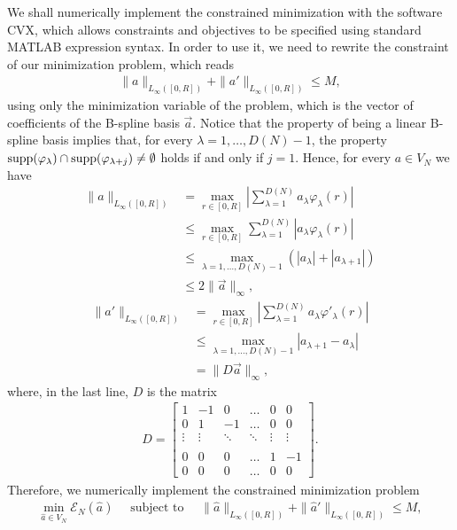We shall numerically implement the constrained minimization with the software CVX, which allows constraints and objectives to be specified using standard MATLAB expression syntax. In order to use it, we need to rewrite the constraint of our minimization problem, which reads
\begin{align*}
	\|a\|_{L_{\infty}([0,R])} + \|a'\|_{L_{\infty}([0,R])} \leq M,
\end{align*}
using only the minimization variable of the problem, which is the vector of coefficients of the B-spline basis $\vec{a}$. Notice that the property of being a linear B-spline basis implies that, for every $\lambda = 1, \ldots, D(N)-1$, the property $\operatorname{supp}(\varphi_{\lambda}) \cap \operatorname{supp}(\varphi_{\lambda + j}) \not= \emptyset$ holds if and only if $j = 1$. Hence, for every $a \in V_N$ we have
\begin{align*}
\|a\|_{L_{\infty}([0,R])} &= \max_{r \in [0,R]} \left|\sum^{D(N)}_{\lambda = 1} a_{\lambda} \varphi_{\lambda}(r)\right| \\
& \leq \max_{r \in [0,R]} \sum^{D(N)}_{\lambda = 1} \left|a_{\lambda} \varphi_{\lambda}(r)\right| \\
& \leq \max_{\lambda = 1, \ldots, D(N)-1} \left(|a_{\lambda}| + |a_{\lambda+1}|\right) \\
& \leq 2 \|\vec{a}\|_{\infty},
\end{align*}
\begin{align*}
\|a'\|_{L_{\infty}([0,R])} &= \max_{r \in [0,R]} \left|\sum^{D(N)}_{\lambda = 1} a_{\lambda} \varphi'_{\lambda}(r)\right| \\
& \leq \max_{\lambda = 1, \ldots, D(N)-1} |a_{\lambda+1} - a_{\lambda}| \\
& = \|D\vec{a}\|_{\infty},
\end{align*}
where, in the last line, $D$ is the matrix
\begin{align*}
D = \begin{bmatrix}
    1       & -1 & 0 & \dots & 0 & 0 \\
    0     & 1 & -1 & \dots & 0 & 0 \\
   \vdots & \vdots & \ddots & \ddots & \vdots & \vdots \\ \\
    0       & 0 & 0 & \dots & 1 & -1 \\
    0       & 0 & 0 & \dots & 0 & 0
\end{bmatrix}.
\end{align*}
Therefore, we numerically implement the constrained minimization problem
\begin{align*}
\min_{\widehat{a} \in V_N} \mathcal{E}_N(\widehat{a}) \quad \text{ subject to } \quad \|\widehat{a}\|_{L_{\infty}([0,R])} + \|\widehat{a}'\|_{L_{\infty}([0,R])} \leq M,
\end{align*}
